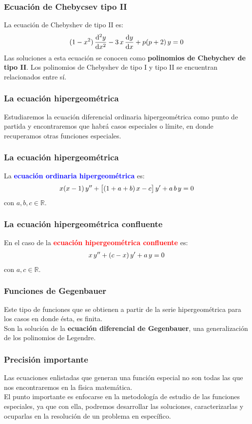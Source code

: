 \documentclass[12pt]{beamer}
\begin{document}
\begin{frame}
\frametitle{Ecuación de Chebycsev tipo II}
La ecuación de Chebyshev de tipo II es:
\pause
\begin{align*}
(1 - x^{2}) \, \dv[2]{y}{x} - 3 \, x \, \dv{y}{x} +  p(p + 2) \, y = 0
\end{align*}
\pause
Las soluciones a esta ecuación se conocen como \textbf{\textcolor{iceberg}{polinomios de Chebychev de tipo II}}. \pause Los polinomios de Chebyshev de tipo I y tipo II se encuentran relacionados entre sí.
\end{frame}
\begin{frame}
\frametitle{La ecuación hipergeométrica}
Estudiaremos la ecuación diferencial ordinaria hipergeométrica como punto de partida y encontraremos que habrá casos especiales o límite, en donde recuperamos otras funciones especiales.
\end{frame}
\begin{frame}
\frametitle{La ecuación hipergeométrica}
La \textbf{\textcolor{blue}{ecuación ordinaria hipergeométrica}} es:
\pause
\begin{align*}
x(x - 1) \, {y}^{\prime \prime} + \big[ (1 + a + b) \, x - c \big] \, {y}^{\prime} +  a \, b \, y = 0
\end{align*}
con $a, b, c \in \mathbb{R}$.
\end{frame}
\begin{frame}
\frametitle{La ecuación hipergeométrica confluente}
En el caso de la \textbf{\textcolor{red}{ecuación hipergeométrica confluente}} es:
\pause
\begin{align*}
x \, {y}^{\prime \prime} + (c - x) \, {y}^{\prime} +  a \, y = 0
\end{align*}
con $a, c \in \mathbb{R}$.
\end{frame}
\begin{frame}
\frametitle{Funciones de Gegenbauer}
Este tipo de funciones que se obtienen a partir de la serie hipergeométrica para los casos en donde ésta, es finita.
\\
\bigskip
\pause
Son la solución de la \textbf{\textcolor{iris}{ecuación diferencial de Gegenbauer}}, una generalización de los polinomios de Legendre.
\end{frame}
\begin{frame}
\frametitle{Precisión importante}
Las ecuaciones enlistadas que generan una función especial no son todas las que nos encontraremos en la física matemática.
\\
\bigskip
\pause
El punto importante es enfocarse en la metodología de estudio de las funciones especiales, ya que con ella, podremos desarrollar las soluciones, caracterizarlas y ocuparlas en la resolución de un problema en específico.
\end{frame}
\end{document}
